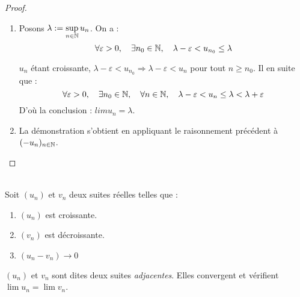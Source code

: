     \begin{proof}
        \ \\
        \begin{enumerate}[label=(\roman*)]
            \item Posons \(\lambda:=\sup\limits_{n\in\mathbb{N}}u_n\). On a : 
            \[
            \forall \varepsilon > 0, \quad \exists n_0 \in \mathbb{N}, \quad \lambda - \varepsilon < u_{n_0} \le \lambda    
            \]
            
            \(u_n\) étant croissante, \(\lambda - \varepsilon < u_{n_0} \Rightarrow \lambda - \varepsilon < u_{n}\) pour tout \(n\ge n_0\).
            Il en suite que :
            \[
            \forall \varepsilon > 0, \quad \exists n_0 \in \mathbb{N}, \quad \forall n\in \mathbb{N}, \quad \lambda - \varepsilon < u_{n} \le \lambda < \lambda + \varepsilon
            \]
            D'où la conclusion : \(lim u_n = \lambda\).

            \item La démonstration s'obtient en appliquant le raisonnement précédent à \((-u_n)_{n\in\mathbb{N}}\).
        \end{enumerate}
    \end{proof}

    \begin{thedef}\ \\
        \label{thm:suites_adjacentes}
        Soit \((u_n)\) et \(v_n\) deux suites réelles telles que :
        \begin{enumerate}[label=\(\alph*\).]
            \item \((u_n)\) est croissante.
            \item \((v_n)\) est décroissante.
            \item \((u_n - v_n) \to 0\)
        \end{enumerate}
        \((u_n)\) et \(v_n\) sont dites deux suites \emph{adjacentes}. Elles convergent et vérifient \(\lim u_n =  \lim v_n\).
    \end{thedef}